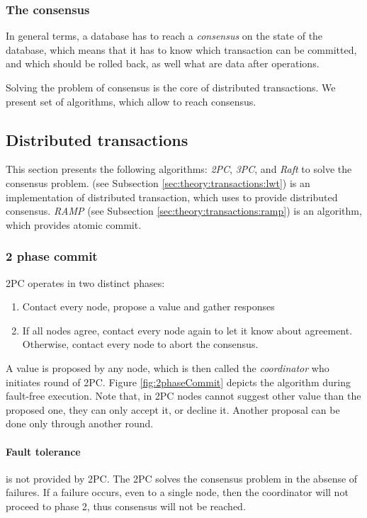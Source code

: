 \subsubsection{The consensus}
In general terms, a database has to reach a \emph{consensus} on the state of the database, which means that it has to
 know which transaction can be committed, and which should be rolled back, as well what are data after operations.

Solving the problem of consensus is the core of distributed transactions. We present set of algorithms, which allow to reach consensus.

\subsection{Distributed transactions}


This section presents the following algorithms: \emph{2PC}, \emph{3PC}, \paxos and \emph{Raft} to solve the consensus problem. \lwt (see Subsection \ref{sec:theory:transactions:lwt}) is an implementation of distributed transaction, which uses \paxos to provide distributed consensus. \emph{RAMP} (see Subsection \ref{sec:theory:transactions:ramp}) is an algorithm, which provides atomic commit.

\subsubsection{2 phase commit}
2PC \cite{2phaseC}  operates in two distinct phases:
\begin{enumerate}
\item Contact every node, propose a value and gather responses
\item If all nodes agree, contact every node again to let it know about agreement. Otherwise, contact every node to abort the consensus.
\end{enumerate}

A value is proposed by any node, which is then called the \emph{coordinator} who initiates round of 2PC.
Figure \ref{fig:2phaseCommit} depicts the algorithm during fault-free execution. Note that, in 2PC nodes cannot suggest other value than the proposed one, they can only accept it, or decline it. Another proposal can be done only through another round.

\paragraph{Fault tolerance} is not provided by 2PC. The 2PC solves the consensus problem in the absense of failures. If a failure occurs, even to a single node, then the coordinator will not proceed to phase 2, thus consensus will not be reached.

